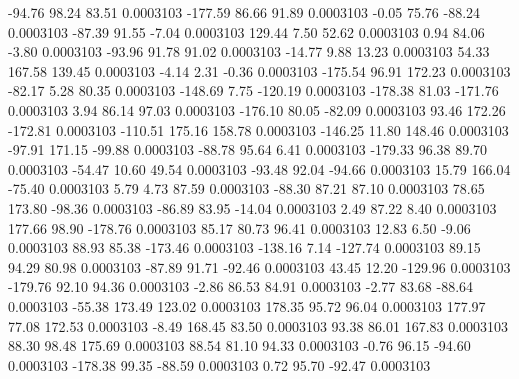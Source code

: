       -94.76       98.24       83.51     0.0003103
     -177.59       86.66       91.89     0.0003103
       -0.05       75.76      -88.24     0.0003103
      -87.39       91.55       -7.04     0.0003103
      129.44        7.50       52.62     0.0003103
        0.94       84.06       -3.80     0.0003103
      -93.96       91.78       91.02     0.0003103
      -14.77        9.88       13.23     0.0003103
       54.33      167.58      139.45     0.0003103
       -4.14        2.31       -0.36     0.0003103
     -175.54       96.91      172.23     0.0003103
      -82.17        5.28       80.35     0.0003103
     -148.69        7.75     -120.19     0.0003103
     -178.38       81.03     -171.76     0.0003103
        3.94       86.14       97.03     0.0003103
     -176.10       80.05      -82.09     0.0003103
       93.46      172.26     -172.81     0.0003103
     -110.51      175.16      158.78     0.0003103
     -146.25       11.80      148.46     0.0003103
      -97.91      171.15      -99.88     0.0003103
      -88.78       95.64        6.41     0.0003103
     -179.33       96.38       89.70     0.0003103
      -54.47       10.60       49.54     0.0003103
      -93.48       92.04      -94.66     0.0003103
       15.79      166.04      -75.40     0.0003103
        5.79        4.73       87.59     0.0003103
      -88.30       87.21       87.10     0.0003103
       78.65      173.80      -98.36     0.0003103
      -86.89       83.95      -14.04     0.0003103
        2.49       87.22        8.40     0.0003103
      177.66       98.90     -178.76     0.0003103
       85.17       80.73       96.41     0.0003103
       12.83        6.50       -9.06     0.0003103
       88.93       85.38     -173.46     0.0003103
     -138.16        7.14     -127.74     0.0003103
       89.15       94.29       80.98     0.0003103
      -87.89       91.71      -92.46     0.0003103
       43.45       12.20     -129.96     0.0003103
     -179.76       92.10       94.36     0.0003103
       -2.86       86.53       84.91     0.0003103
       -2.77       83.68      -88.64     0.0003103
      -55.38      173.49      123.02     0.0003103
      178.35       95.72       96.04     0.0003103
      177.97       77.08      172.53     0.0003103
       -8.49      168.45       83.50     0.0003103
       93.38       86.01      167.83     0.0003103
       88.30       98.48      175.69     0.0003103
       88.54       81.10       94.33     0.0003103
       -0.76       96.15      -94.60     0.0003103
     -178.38       99.35      -88.59     0.0003103
        0.72       95.70      -92.47     0.0003103
